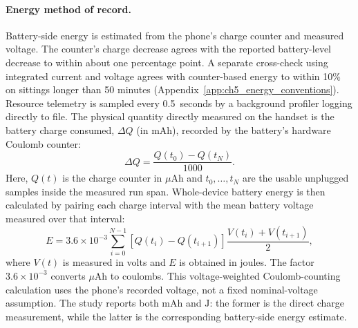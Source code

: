 \paragraph{Energy method of record.} Battery-side energy is estimated from the phone's charge counter
and measured voltage. The counter's charge decrease agrees with the reported battery-level decrease
to within about one percentage point. A separate cross-check using integrated current and voltage
agrees with counter-based energy to within 10\% on sittings longer than 50 minutes
(Appendix~\ref{app:ch5_energy_conventions}). Resource telemetry is sampled every 0.5~seconds by a background
profiler logging directly to file. The physical quantity directly measured on the handset is the battery
charge consumed, $\Delta Q$ (in $\text{mAh}$), recorded by the battery's hardware Coulomb counter:
\begin{equation}
  \label{eq:charge_formula}
  \Delta Q = \frac{Q(t_0)-Q(t_N)}{1000}.
\end{equation}
Here, $Q(t)$ is the charge counter in $\mu\text{Ah}$ and $t_0,\ldots,t_N$ are the usable unplugged
samples inside the measured run span. Whole-device battery energy is then calculated by pairing each
charge interval with the mean battery voltage measured over that interval:
\begin{equation}
  \label{eq:energy_formula}
  E = 3.6 \times 10^{-3}
      \sum_{i=0}^{N-1}
      \left[Q(t_i)-Q(t_{i+1})\right]
      \frac{V(t_i)+V(t_{i+1})}{2},
\end{equation}
where $V(t)$ is measured in volts and $E$ is obtained in joules. The factor
$3.6\times10^{-3}$ converts $\mu\text{Ah}$ to coulombs. This voltage-weighted Coulomb-counting
calculation uses the phone's recorded voltage, not a fixed nominal-voltage assumption. The
study reports both $\text{mAh}$ and $\text{J}$: the former is the direct charge measurement, while
the latter is the corresponding battery-side energy estimate.

